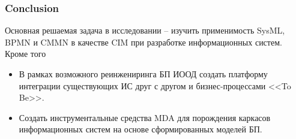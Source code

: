 \documentclass[10pt]{beamer}
\begin{document}
\begin{frame}
  \frametitle{Conclusion}
  Основная решаемая задача в исследовании -- изучить применимость SysML, BPMN и CMMN в качестве CIM при разработке информационных систем. Кроме того
  \begin{itemize}
  \item В рамках возможного реинжениринга БП ИООД создать платформу интеграции существующих ИС друг с другом и бизнес-процессами <<To Be>>.
  \item Создать инструментальные средства MDA для порождения каркасов информационных систем на основе сформированных моделей БП.
  \end{itemize}
\end{frame}
\end{document}
